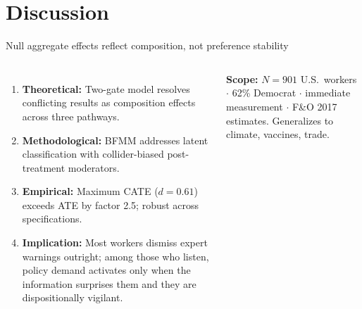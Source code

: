 \documentclass[aspectratio=169,11pt]{beamer}
\begin{document}
\section{Discussion}

\begin{frame}{Null aggregate effects reflect composition, not preference stability}

\begin{columns}[T]
\begin{enumerate}
    \item \textbf{Theoretical:} Two-gate model resolves conflicting results as composition effects across three pathways.
    \item \textbf{Methodological:} BFMM addresses latent classification with collider-biased post-treatment moderators.
    \item \textbf{Empirical:} Maximum CATE ($d = 0.61$) exceeds ATE by factor 2.5; robust across specifications.
    \item \textbf{Implication:} Most workers dismiss expert warnings outright; among those who listen, policy demand activates only when the information surprises them and they are dispositionally vigilant.
\end{enumerate}

\vspace{0.5cm}
{\small \textcolor{sbuamber}{\textbf{Scope:}} $N = 901$ U.S.\ workers $\cdot$ 62\% Democrat $\cdot$ immediate measurement $\cdot$ F\&O 2017 estimates. Generalizes to climate, vaccines, trade.}
\end{columns}

\end{frame}
\end{document}
